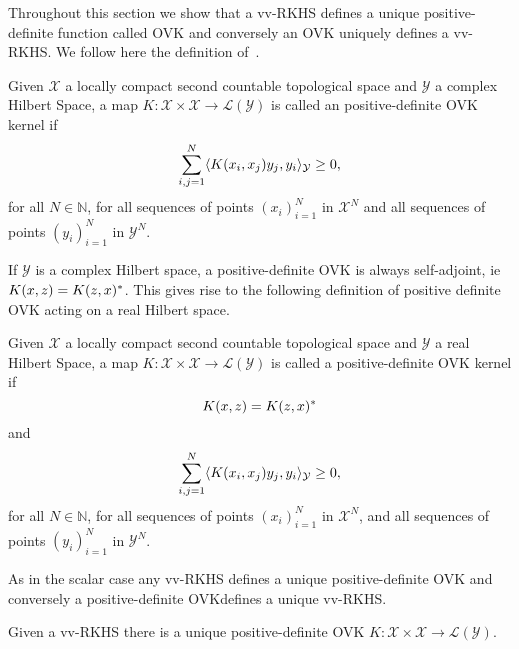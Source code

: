 Throughout this section we show that a \ac{vv-RKHS} defines a unique
positive-definite function called \acf{OVK} and conversely an \ac{OVK} uniquely
defines a \ac{vv-RKHS}. We follow here the definition of~\citet{Carmeli2010}.
\begin{definition}
    \label{def:reproducing_kernel}
    Given $\mathcal{X}$ a locally compact second countable topological space
    and  $\mathcal{Y}$ a complex Hilbert Space, a map
    $K:\mathcal{X}\times\mathcal{X}\to\mathcal{L}(\mathcal{Y})$ is called an
    positive-definite \acl{OVK} kernel if
    \begin{dmath}
        \sum_{i,j=1}^N\inner{K(x_i,x_j)y_j,y_i}_{\mathcal{Y}}\ge 0,
    \end{dmath}
    for all $N\in\mathbb{N}$, for all sequences of points $(x_i)_{i=1}^N$ in
    $\mathcal{X}^N$ and all sequences of points $(y_i)_{i=1}^N$ in
    $\mathcal{Y}^N$. \label{def:ovk}
\end{definition}
If $\mathcal{Y}$ is a complex Hilbert space, a positive-definite \acl{OVK} is
always self-adjoint, \acs{ie}~$K(x,z)=K(z,x)^*$. This gives rise to the
following definition of positive definite \acl{OVK} acting on a real Hilbert
space.
\begin{definition}
    \label{def:reproducing_kernel_real} Given $\mathcal{X}$ a locally compact
    second countable topological space and $\mathcal{Y}$ a real Hilbert Space,
    a map $K:\mathcal{X}\times\mathcal{X}\to\mathcal{L}(\mathcal{Y})$ is called
    a positive-definite \acl{OVK} kernel if
    \begin{dmath}
        K(x,z)=K(z,x)^\adjoint
    \end{dmath}
    and
    \begin{dmath}
        \sum_{i,j=1}^N\inner{K(x_i,x_j)y_j,y_i}_{\mathcal{Y}}\ge 0,
    \end{dmath}
    for all $N\in\mathbb{N}$, for all sequences of points $(x_i)_{i=1}^N$ in
    $\mathcal{X}^N$, and all sequences of points  $(y_i)_{i=1}^N$ in
    $\mathcal{Y}^N$. \label{def:ovk_real}
\end{definition}
As in the scalar case any \acl{vv-RKHS} defines a unique positive-definite
\acl{OVK} and conversely a positive-definite \acl{OVK}defines a unique
\acl{vv-RKHS}.
\begin{proposition}
    \label{pr:unique_rkhs} Given a \acl{vv-RKHS} there is a unique
    positive-definite \acl{OVK}
    $K:\mathcal{X}\times\mathcal{X}\to\mathcal{L}(\mathcal{Y})$.
\end{proposition}
